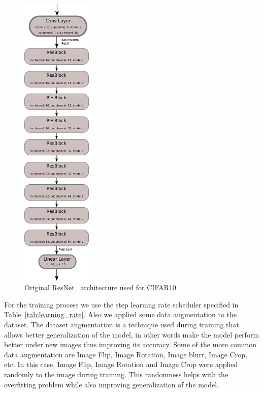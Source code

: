 \documentclass[english,preprint,JIP]{ipsj}
\begin{document}
\begin{figure}
    \centering
    \includegraphics[width=0.3\textwidth]{img/cifar_resnet2.png}
    \caption{Original ResNet~\cite{} architecture used for CIFAR10}
    \label{fig:cifar_original_resnet}
\end{figure}


For the training process we use the step learning rate scheduler specified in
Table~\ref{tab:learning_rate}. Also we applied some data augmentation to the
dataset. The dataset augmentation is a technique used during training that
allows better generalization of the model, in other words make the model perform
better under new images thus improving its accuracy. Some of the more common
data augmentation are Image Flip, Image Rotation, Image blurr, Image Crop, etc.
In this case, Image Flip, Image Rotation and Image Crop were applied randomly to
the image during training. This randomness helps with the overfitting problem
while also improving generalization of the model.\\
\end{document}
